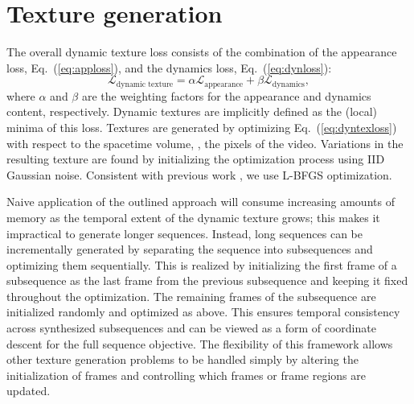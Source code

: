 \section{Texture generation}\label{sec:texgen}
The overall dynamic texture loss consists of the combination of the appearance loss, Eq.\ (\ref{eq:apploss}),
and the dynamics loss, Eq.\ (\ref{eq:dynloss}):
\begin{equation}
   \mathcal{L}_\text{dynamic texture} = \alpha\mathcal{L}_\text{appearance} + \beta \mathcal{L}_\text{dynamics}, \label{eq:dyntexloss}
\end{equation}
where $\alpha$ and $\beta$ are the weighting factors for the
appearance and dynamics content, respectively.
Dynamic textures are implicitly defined as the (local) minima 
of this loss.
Textures are generated by optimizing Eq.\ 
(\ref{eq:dyntexloss}) with respect to the spacetime volume,
\ie, the pixels of the video.
Variations in the resulting texture are found by initializing the
optimization process using IID Gaussian noise.
Consistent with previous work \cite{gatys2015}, we use
L-BFGS \cite{liu1989} optimization. 

Naive application of the outlined approach will consume
increasing amounts of memory as the temporal extent of the 
dynamic texture grows; this makes it impractical to generate
longer sequences.
Instead, long sequences can be incrementally generated by
separating the sequence into subsequences and optimizing them 
sequentially.  This is realized by initializing the first frame of a subsequence as the last 
frame from the previous subsequence and keeping it fixed throughout
the optimization.
The remaining frames of the subsequence are initialized randomly and
optimized as above.
This ensures temporal consistency across synthesized subsequences
and can be viewed as a form of coordinate descent for the full
sequence objective.
The flexibility of this framework allows other texture generation
problems to be handled simply by altering the 
initialization of frames and controlling which
frames or frame regions are updated.